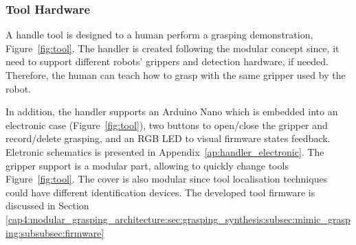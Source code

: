 \subsubsection{Tool Hardware}
\label{cap4:modular_grasping_architecture:sec:grasping_synthesis:subsec:mimic_grasping:subsubsec:hardware}


A handle tool is designed to a human perform a grasping demonstration, Figure~\ref{fig:tool}. The handler is created following the modular concept since, it need to support different robots' grippers and detection hardware, if needed. Therefore, the human can teach how to grasp with the same gripper used by the robot.%

In addition, the handler supports an Arduino Nano which is embedded into an electronic case (Figure~\ref{fig:tool}), two buttons to open/close the gripper and record/delete grasping, and an RGB LED to visual firmware states feedback. Eletronic schematics is presented in Appendix~\ref{ap:handler_electronic}. The gripper support is a modular part, allowing to quickly change tools Figure~\ref{fig:tool}. The cover is also modular since tool localisation techniques could have different identification devices. The developed tool firmware is discussed in Section \ref{cap4:modular_grasping_architecture:sec:grasping_synthesis:subsec:mimic_grasping:subsubsec:firmware}


